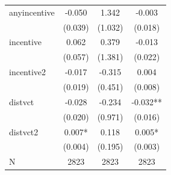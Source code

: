 \begin{tabular}{lccc}
\hline
anyincentive & -0.050 & 1.342 & -0.003 \\
 & (0.039) & (1.032) & (0.018) \\
incentive & 0.062 & 0.379 & -0.013 \\
 & (0.057) & (1.381) & (0.022) \\
incentive2 & -0.017 & -0.315 & 0.004 \\
 & (0.019) & (0.451) & (0.008) \\
distvct & -0.028 & -0.234 & -0.032** \\
 & (0.020) & (0.971) & (0.016) \\
distvct2 & 0.007* & 0.118 & 0.005* \\
 & (0.004) & (0.195) & (0.003) \\
\hline
N & 2823 & 2823 & 2823 \\
\hline
\end{tabular}
